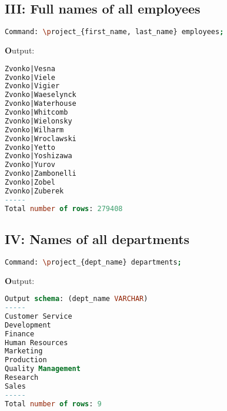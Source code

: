 \documentclass[12pt]{report}
\begin{document}
\subsection*{III: Full names of all employees}
\begin{lstlisting}[language=bash]
Command: \project_{first_name, last_name} employees;
\end{lstlisting}
\textbf Output:
\begin{lstlisting}[language=sql]
Zvonko|Vesna
Zvonko|Viele
Zvonko|Vigier
Zvonko|Waeselynck
Zvonko|Waterhouse
Zvonko|Whitcomb
Zvonko|Wielonsky
Zvonko|Wilharm
Zvonko|Wroclawski
Zvonko|Yetto
Zvonko|Yoshizawa
Zvonko|Yurov
Zvonko|Zambonelli
Zvonko|Zobel
Zvonko|Zuberek
-----
Total number of rows: 279408

\end{lstlisting}

\subsection*{IV: Names of all departments}
\begin{lstlisting}[language=bash]
Command: \project_{dept_name} departments;
\end{lstlisting}
\textbf Output:


\begin{lstlisting}[language=sql]
Output schema: (dept_name VARCHAR)
-----
Customer Service
Development
Finance
Human Resources
Marketing
Production
Quality Management
Research
Sales
-----
Total number of rows: 9
\end{lstlisting}
\end{document}
